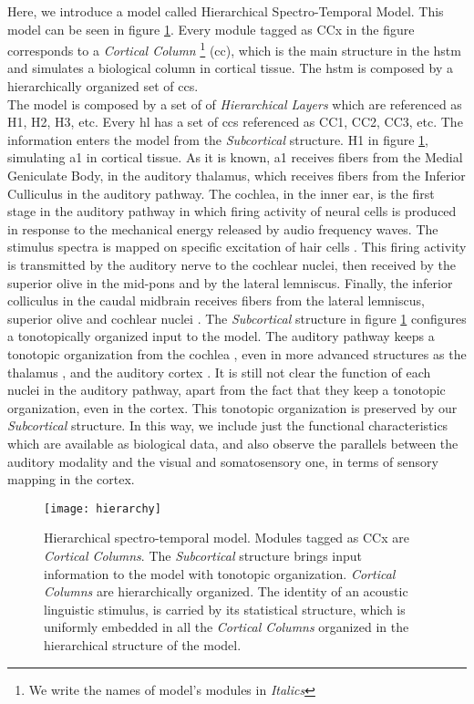 \documentclass[11pt,a4paper]{article}
\begin{document}
Here, we introduce a model called Hierarchical Spectro-Temporal Model.
This model can be seen in figure \ref{fig:hstm}.
Every module tagged as CCx  in the figure corresponds to
a \textit{Cortical Column} \footnote{We write the names of model's modules in \textit{Italics}}
(\ac{cc}), which is the main structure in the \ac{hstm} and simulates a biological column in cortical tissue.
The \ac{hstm} is composed by a hierarchically organized set of \ac{cc}s.\\

The model is composed by a set of of \textit{Hierarchical Layers} which are referenced
as H1, H2, H3, etc.
Every \ac{hl} has a set of \ac{cc}s referenced as CC1, CC2, CC3, etc.
The information enters the model from the \textit{Subcortical} structure.
H1 in figure \ref{fig:hstm}, simulating \ac{a1} in cortical tissue.
As it is known, \ac{a1} receives fibers from the Medial Geniculate Body,
in the auditory thalamus, which receives fibers from the Inferior Culliculus
in the auditory pathway.
The cochlea, in the inner ear, is the first stage in the auditory
pathway in which firing activity of neural cells is produced
in response to the mechanical energy released by audio frequency waves.
The stimulus spectra is mapped on specific excitation of hair cells \cite{moore03}.
This firing activity is transmitted by the auditory nerve to the cochlear nuclei,
then received by the superior olive in the mid-pons and by the lateral lemniscus.
Finally, the inferior colliculus in the caudal midbrain receives fibers from
the lateral lemniscus, superior olive and cochlear nuclei \cite{purves04}.
The \textit{Subcortical} structure in figure \ref{fig:hstm} configures
a tonotopically organized input to the model.
The auditory pathway keeps a tonotopic organization from the cochlea \cite{read02},
even in more advanced structures as the thalamus \cite{barkat11}, and the auditory cortex \cite{humphries10}.
It is still not clear the function of each nuclei in the auditory pathway, apart from the fact
that they keep a tonotopic organization, even in the cortex.
This tonotopic organization is preserved by our \textit{Subcortical} structure.
In this way, we include just the functional characteristics which are available as biological data,
and also observe the parallels between the auditory modality and the visual and somatosensory one,
in terms of sensory mapping in the cortex.\\

\begin{figure}[h]
\centering
\texttt{[image: hierarchy]}
\caption{\scriptsize{Hierarchical spectro-temporal model.
Modules tagged as CCx are \textit{Cortical Columns}.
The \textit{Subcortical} structure brings input information
to the model with tonotopic organization.
\textit{Cortical Columns} are hierarchically organized.
The identity of an acoustic linguistic stimulus,
is carried by its statistical structure, which is
uniformly embedded in all the \textit{Cortical Columns}
organized in the hierarchical structure of the model.}}
\label{fig:hstm}
\end{figure}
\end{document}
